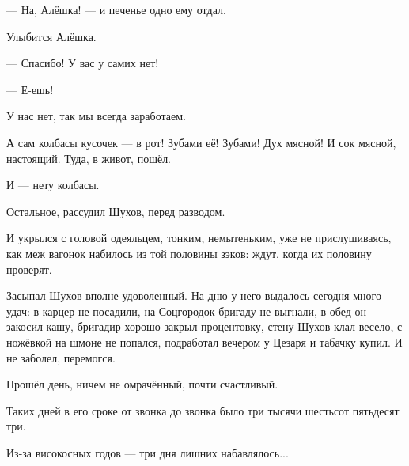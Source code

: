 --- На, Алёшка! --- и печенье одно ему отдал.

Улыбится Алёшка.

--- Спасибо! У вас у самих нет!

--- Е-ешь!

У нас нет, так мы всегда заработаем.

А сам колбасы кусочек --- в рот! Зубами её! Зубами! Дух мясной! И сок мясной, настоящий. Туда, в
живот, пошёл.

И --- нету колбасы.

Остальное, рассудил Шухов, перед разводом.

И укрылся с головой одеяльцем, тонким, немытеньким, уже не прислушиваясь, как меж вагонок
набилось из той половины зэков: ждут, когда их половину проверят.


Засыпал Шухов вполне удоволенный. На дню у него выдалось сегодня много удач: в карцер не
посадили, на Соцгородок бригаду не выгнали, в обед он закосил кашу, бригадир хорошо закрыл
процентовку, стену Шухов клал весело, с ножёвкой на шмоне не попался, подработал вечером у
Цезаря и табачку купил. И не заболел, перемогся.

Прошёл день, ничем не омрачённый, почти счастливый.


Таких дней в его сроке от звонка до звонка было три тысячи шестьсот пятьдесят три.

Из-за високосных годов --- три дня лишних набавлялось...
\bye
